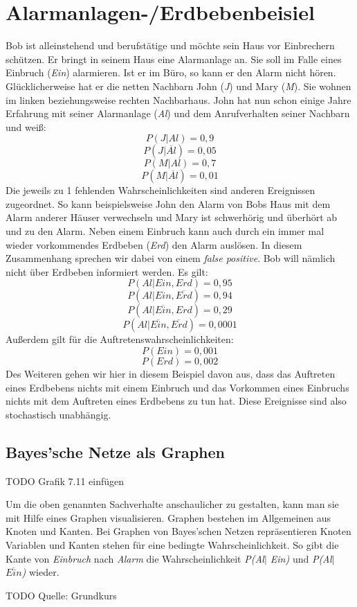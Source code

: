 \section{Alarmanlagen-/Erdbebenbeisiel}
Bob ist alleinstehend und berufstätige und möchte sein Haus vor Einbrechern schützen. Er bringt in seinem Haus eine Alarmanlage an. Sie soll im Falle eines Einbruch (\textit{Ein}) alarmieren. Ist er im Büro, so kann er den Alarm nicht hören. Glücklicherweise hat er die netten Nachbarn John (\textit{J}) und Mary (\textit{M}). Sie wohnen im linken beziehungsweise rechten Nachbarhaus. John hat nun schon einige Jahre Erfahrung mit seiner Alarmanlage (\textit{Al}) und dem Anrufverhalten seiner Nachbarn und weiß: 
\[ P(J\vert Al) = 0,9\] 
\[ P(J\vert \overline{Al}) = 0,05\]
\[ P(M\vert Al) = 0,7\]
\[ P(M\vert \overline{Al} ) = 0,01\]
Die jeweils zu 1 fehlenden Wahrscheinlichkeiten sind anderen Ereignissen zugeordnet. So kann beispielsweise John den Alarm von Bobs Haus mit dem Alarm anderer Häuser verwechseln und Mary ist schwerhörig und überhört ab und zu den Alarm. 
Neben einem Einbruch kann auch durch ein immer mal wieder vorkommendes Erdbeben (\textit{Erd}) den Alarm auslösen. In diesem Zusammenhang sprechen wir dabei von einem \textit{false positive}. Bob will nämlich nicht über Erdbeben informiert werden. Es gilt:
\[ P(Al\vert Ein, Erd) = 0,95\] 
\[ P(Al\vert Ein,\overline{Erd}) = 0,94\]
\[ P(Al\vert \overline{Ein}, Erd) = 0,29\]
\[ P(Al\vert \overline{Ein}, \overline{Erd})  = 0,0001\]
Außerdem gilt für die Auftretenswahrscheinlichkeiten: 
\[ P(Ein) = 0,001\]
\[ P(Erd) = 0,002\]
Des Weiteren gehen wir hier in diesem Beispiel davon aus, dass das Auftreten eines Erdbebens nichts mit einem Einbruch und das Vorkommen eines Einbruchs nichts mit dem Auftreten eines Erdbebens zu tun hat. Diese Ereignisse sind also stochastisch unabhängig.   
\subsection{Bayes'sche Netze als Graphen}
TODO Grafik 7.11 einfügen

Um die oben genannten Sachverhalte anschaulicher zu gestalten, kann man sie mit Hilfe eines Graphen visualisieren. Graphen bestehen im Allgemeinen aus Knoten und Kanten. Bei Graphen von Bayes'schen Netzen repräsentieren Knoten Variablen und Kanten stehen für eine bedingte Wahrscheinlichkeit. So gibt die Kante von \textit{Einbruch} nach \textit{Alarm} die Wahrscheinlichkeit \textit{P(Al$\vert$ Ein)} und \textit{P(Al$\vert$ $\overline{Ein}$)} wieder. 



TODO Quelle: Grundkurs

